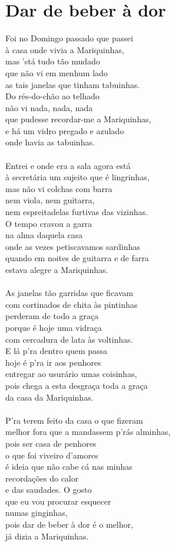 \documentclass{article}
\begin{document}
\section{ Dar de beber à dor}
Foi no Domingo passado que passei\\
à casa onde vivia a Mariquinhas,\\
mas 'stá tudo tão mudado\\
que não vi em menhum lado\\
as tais janelas que tinham tabuinhas.\\
Do rés-do-chão ao telhado\\
não vi nada, nada, nada\\
que pudesse recordar-me a Mariquinhas,\\
e há um vidro pregado e azulado\\
onde havia as tabuinhas.\\
\\
Entrei e onde era a sala agora está\\
à secretária um sujeito que é lingrinhas,\\
mas não vi colchas com barra\\
nem viola, nem guitarra,\\
nem espreitadelas furtivas das vizinhas.\\
O tempo cravou a garra\\
na alma daquela casa\\
onde as vezes petiscavamos sardinhas\\
quando em noites de guitarra e de farra\\
estava alegre a Mariquinhas.\\
\\
As janelas tão garridas que ficavam\\
com cortinados de chita às pintinhas\\
perderam de todo a graça\\
porque é hoje uma vidraça\\
com cercadura de lata às voltinhas.\\
E lá p'ra dentro quem passa\\
hoje é p'ra ir aos penhores\\
entregar ao usurário umas coisinhas,\\
pois chega a esta desgraça toda a graça\\
da casa da Mariquinhas.\\
\\
P'ra terem feito da casa o que fizeram\\
melhor fora que a mandassem p'rás alminhas,\\
pois ser casa de penhores\\
o que foi viveiro d'amores\\
é ideia que não cabe cá nas minhas\\
recordações do calor \\
e das saudades. O gosto\\
que eu vou procurar esquecer\\
numas ginginhas,\\
pois dar de beber à dor é o melhor,\\
já dizia a Mariquinhas.\\
\end{document}
